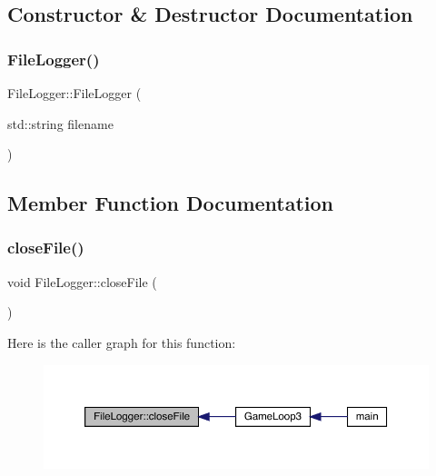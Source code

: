 \subsection{Constructor \& Destructor Documentation}
\mbox{\label{class_file_logger_a7e1527826890498c11dd2f09c6c04c7e}} 
\subsubsection{\texorpdfstring{File\+Logger()}{FileLogger()}}
{\footnotesize\ttfamily File\+Logger\+::\+File\+Logger (\begin{DoxyParamCaption}\item[{std\+::string}]{filename }\end{DoxyParamCaption})}



\subsection{Member Function Documentation}
\mbox{\label{class_file_logger_a615be6cc97dec3ad38a085b063669f8e}} 
\subsubsection{\texorpdfstring{close\+File()}{closeFile()}}
{\footnotesize\ttfamily void File\+Logger\+::close\+File (\begin{DoxyParamCaption}{ }\end{DoxyParamCaption})}

Here is the caller graph for this function\+:
\nopagebreak
\begin{figure}[H]
\begin{center}
\leavevmode
\includegraphics[width=350pt]{class_file_logger_a615be6cc97dec3ad38a085b063669f8e_icgraph}
\end{center}
\end{figure}
\mbox{\label{class_file_logger_a5bb4f335d8d25b52ba2799d8b73ba037}} 
